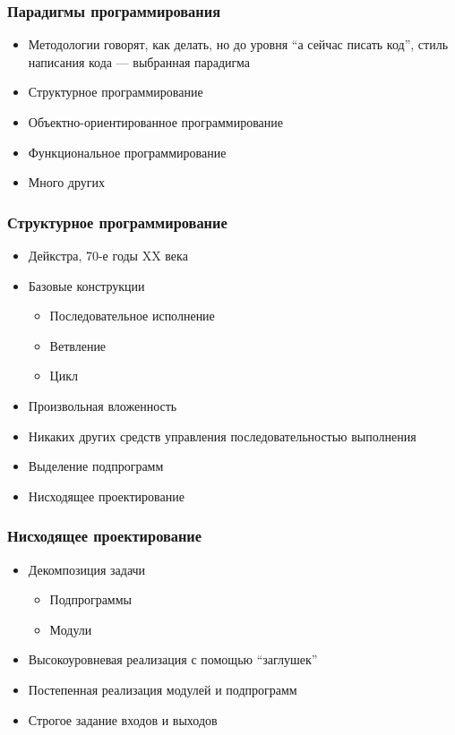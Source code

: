 \documentclass[xetex,mathserif,serif]{beamer}
\begin{document}
	\begin{frame}
		\frametitle{Парадигмы программирования}
		\begin{itemize}
			\item Методологии говорят, как делать, но до уровня ``а сейчас писать код'', стиль написания кода --- выбранная парадигма
			\item Структурное программирование
			\item Объектно-ориентированное программирование
			\item Функциональное программирование
			\item Много других
		\end{itemize}
	\end{frame}

	\begin{frame}
		\frametitle{Структурное программирование}
		\begin{itemize}
			\item Дейкстра, 70-е годы XX века
			\item Базовые конструкции
			\begin{itemize}
				\item Последовательное исполнение
				\item Ветвление
				\item Цикл
			\end{itemize}
			\item Произвольная вложенность
			\item Никаких других средств управления последовательностью выполнения
			\item Выделение подпрограмм
			\item Нисходящее проектирование
		\end{itemize}
	\end{frame}

	\begin{frame}
		\frametitle{Нисходящее проектирование}
		\begin{itemize}
			\item Декомпозиция задачи
			\begin{itemize}
				\item Подпрограммы
				\item Модули
			\end{itemize}
			\item Высокоуровневая реализация с помощью ``заглушек''
			\item Постепенная реализация модулей и подпрограмм
			\item Строгое задание входов и выходов
		\end{itemize}
	\end{frame}
\end{document}
